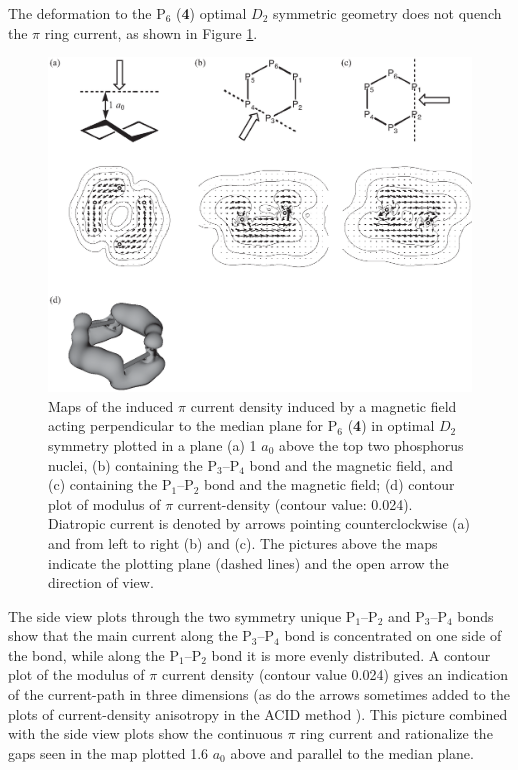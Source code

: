 The deformation to the P$_6$ (\textbf{4}) optimal $D_2$ symmetric geometry does not quench the $\pi$ ring current, as shown in Figure \ref{ch6.figure6}.
\begin{figure}[htbp]
\center
\includegraphics[scale=0.68]{inorganic/figures/figure6.eps}
\caption{Maps of the induced $\pi$ current density induced by a magnetic field acting perpendicular to
the median plane for P$_6$ (\textbf{4}) in optimal $D_2$ symmetry plotted in a plane (a) 1 $a_0$ above the top
two phosphorus nuclei, (b) containing the P$_3$--P$_4$ bond and the magnetic field, and (c) containing the
P$_1$--P$_2$ bond and the magnetic field; (d) contour plot of modulus of $\pi$ current-density (contour value: 0.024). 
Diatropic current is denoted by arrows pointing counterclockwise (a) and from left to right (b) and (c). 
The pictures above the maps indicate the plotting plane (dashed lines) and the open arrow the direction of view.}
\label{ch6.figure6}
\end{figure}
The side view plots through the
two symmetry unique \mbox{P$_1$--P$_2$} and \mbox{P$_3$--P$_4$} bonds show that the main
current along the \mbox{P$_3$--P$_4$} bond is concentrated on one side of the bond, while
along the \mbox{P$_1$--P$_2$} bond it is more evenly distributed.  A contour plot of the
modulus of $\pi$ current density (contour value 0.024) gives an indication of the current-path
in three dimensions (as do the arrows sometimes added to the plots of current-density anisotropy in the
ACID method \cite{herges}). This picture combined with
the side view plots show the continuous $\pi$ ring current and rationalize the gaps seen in
the map plotted 1.6 $a_{\mathrm{0}}$ above and parallel to the median plane.

